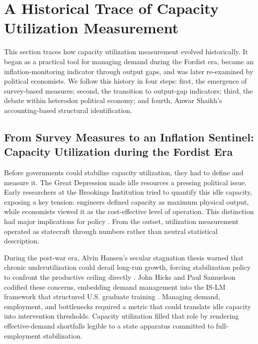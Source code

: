\documentclass[11pt]{article}
\begin{document}
\section{A Historical Trace of Capacity Utilization Measurement}
\label{sec:literature_review}

This section traces how capacity utilization measurement evolved historically. It began as a practical tool for managing demand during the Fordist era, became an inflation-monitoring indicator through output gaps, and was later re-examined by political economists. We follow this history in four steps: first, the emergence of survey-based measures; second, the transition to output-gap indicators; third, the debate within heterodox political economy; and fourth, Anwar Shaikh's accounting-based structural identification.

\subsection{From Survey Measures to an Inflation Sentinel: Capacity Utilization during the Fordist Era}
\label{subsec:fordist_survey_statecraft}

Before governments could stabilize capacity utilization, they had to define and measure it. The Great Depression made idle resources a pressing political issue. Early researchers at the Brookings Institution tried to quantify this idle capacity, exposing a key tension: engineers defined capacity as maximum physical output, while economists viewed it as the cost-effective level of operation. This distinction had major implications for policy \citep{Burns1954, KleinDavid1958}. From the outset, utilization measurement operated as statecraft through numbers rather than neutral statistical description.

During the post-war era, Alvin Hansen's secular stagnation thesis warned that chronic underutilization could derail long-run growth, forcing stabilization policy to confront the productive ceiling directly \citep{Hansen1936, Hansen1941, Barber1987}. John Hicks and Paul Samuelson codified these concerns, embedding demand management into the IS-LM framework that structured U.S. graduate training \citep{Hicks1937, Samuelson1947, Samuelson1948}. Managing demand, employment, and bottlenecks required a metric that could translate idle capacity into intervention thresholds. Capacity utilization filled that role by rendering effective-demand shortfalls legible to a state apparatus committed to full-employment stabilization.
\end{document}
